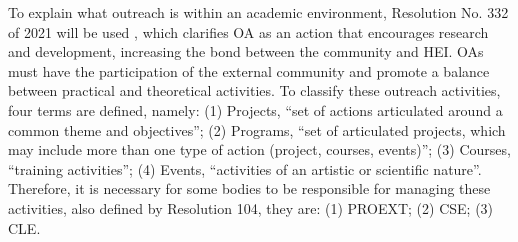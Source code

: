 


To explain what outreach is within an academic environment, Resolution No. 332 of 2021 will be used \cite{Resolucao-332:2021}, which clarifies \ac{OA} as an action that encourages research and development, increasing the bond between the community and \ac{HEI}. 
\acp{OA} must have the participation of the external community and promote a balance between practical and theoretical activities. 
To classify these outreach activities, four terms are defined, namely: 
(1) Projects, ``set of actions articulated around a common theme and objectives''; 
(2) Programs, ``set of articulated projects, which may include more than one type of action (project, courses, events)''; 
(3) Courses, ``training activities''; 
(4) Events, ``activities of an artistic or scientific nature''. 
Therefore, it is necessary for some bodies to be responsible for managing these activities, also defined by Resolution 104, they are: (1) \ac{PROEXT}; (2) \ac{CSE}; (3) \ac{CLE}.




